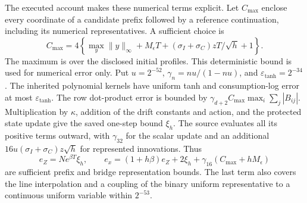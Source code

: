 The executed account makes these numerical terms explicit. Let
$C_{\max}$ enclose every coordinate of a candidate prefix followed by
a reference continuation, including its numerical representatives.
A sufficient choice is
\[
 C_{\max}=4\left\{\max_y\|y\|_\infty+M_\epsilon T
          +(\sigma_I+\sigma_C)zT/\sqrt h+1\right\}.
\]
The maximum is over the disclosed initial profiles. This deterministic
bound is used for numerical error only. Put $u=2^{-52}$,
$\gamma_n=nu/(1-nu)$, and $\varepsilon_{\tanh}=2^{-34}$.
The inherited polynomial kernels have uniform tanh and consumption-log
error at most $\varepsilon_{\tanh}$. The row dot-product error is bounded
by $\gamma_{d+2}C_{\max}\max_i\sum_j|B_{ij}|$.
Multiplication by $\kappa$, addition of the drift constants and action,
and the protected state update give the saved one-step bound $\xi_h$.
The source evaluates all its positive terms outward, with
$\gamma_{32}$ for the scalar update and an additional
$16u(\sigma_I+\sigma_C)z\sqrt h$ for represented innovations.
Thus
\[
 e_Z=Ne^{\beta T}\xi_h,\qquad
 e_x=(1+h\beta)e_Z+2\xi_h+
                     \gamma_{16}(C_{\max}+hM_\epsilon)
\]
are sufficient prefix and bridge representation bounds. The last term
also covers the line interpolation and a coupling of the binary uniform
representative to a continuous uniform variable within $2^{-53}$.

